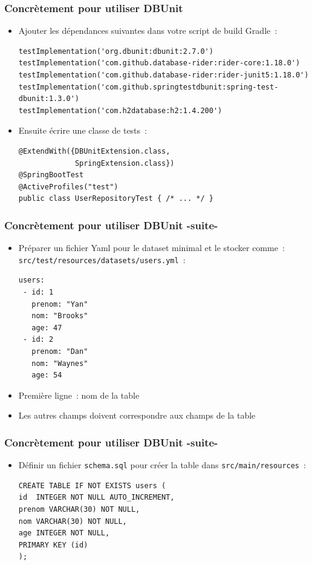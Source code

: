 \documentclass{beamer}
\begin{document}
\begin{frame}[fragile]
	\frametitle{Concrètement pour utiliser DBUnit}
	\begin{itemize}
		\item Ajouter les dépendances suivantes dans votre script de build Gradle~:
\begin{lstlisting}
testImplementation('org.dbunit:dbunit:2.7.0')
testImplementation('com.github.database-rider:rider-core:1.18.0')
testImplementation('com.github.database-rider:rider-junit5:1.18.0')
testImplementation('com.github.springtestdbunit:spring-test-dbunit:1.3.0')
testImplementation('com.h2database:h2:1.4.200')
\end{lstlisting}
\item Ensuite écrire une classe de tests~:
\begin{lstlisting}
@ExtendWith({DBUnitExtension.class, 
	         SpringExtension.class})
@SpringBootTest
@ActiveProfiles("test")
public class UserRepositoryTest { /* ... */ }
\end{lstlisting}
	\end{itemize}
\end{frame}

\begin{frame}[fragile]
	\frametitle{Concrètement pour utiliser DBUnit -suite-}
	\begin{itemize}
		\item Préparer un fichier Yaml pour le dataset minimal et le stocker comme~: \texttt{src/test/resources/datasets/users.yml}~:
\begin{lstlisting}
users:
 - id: 1
   prenom: "Yan"
   nom: "Brooks"
   age: 47
 - id: 2
   prenom: "Dan"
   nom: "Waynes"
   age: 54
\end{lstlisting}
\item Première ligne~: nom de la table\\
\item Les autres champs doivent correspondre aux champs de la table
	\end{itemize}
\end{frame}

\begin{frame}[fragile]
	\frametitle{Concrètement pour utiliser DBUnit -suite-}
	\begin{itemize}
		\item Définir un fichier \texttt{schema.sql} pour créer la table dans \texttt{src/main/resources}~:
\begin{lstlisting}
CREATE TABLE IF NOT EXISTS users (
id  INTEGER NOT NULL AUTO_INCREMENT,
prenom VARCHAR(30) NOT NULL,
nom VARCHAR(30) NOT NULL,
age INTEGER NOT NULL,
PRIMARY KEY (id)
);
\end{lstlisting}
	\end{itemize}
\end{frame}
\end{document}
